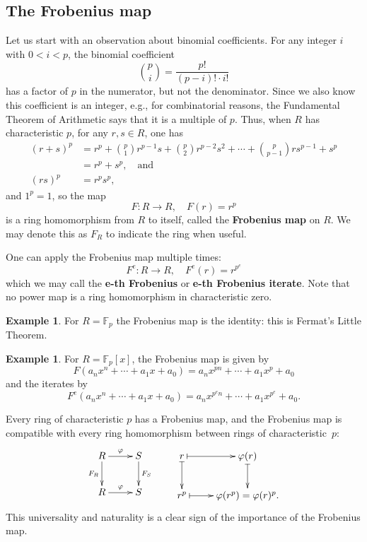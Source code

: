 \documentclass[12pt]{amsart}
\theoremstyle{definition}
\newtheorem{example}[theorem]{Example}
\numberwithin{equation}{theorem}
\def\FF{\mathbb{F}}
\def\phi{\varphi}
\def\to{\longrightarrow}
\begin{document}
\subsection*{The Frobenius map}
Let us start with an observation about binomial coefficients. For any integer $i$ with $0<i<p$, the binomial coefficient 
\[\binom{p}{i} = \frac{p!}{(p-i)! \cdot i!}\]
has a factor of $p$ in the numerator, but not the denominator. Since we also know this coefficient is an integer, e.g., for combinatorial reasons, the Fundamental Theorem of Arithmetic says that it is a multiple of $p$.
Thus, when $R$ has characteristic $p$, for any $r,s\in R$, one has
\[ \begin{aligned} (r+s)^p &= r^p + \binom{p}{1} r^{p-1} s + \binom{p}{2} r^{p-2} s^2 + \cdots + \binom{p}{p-1} r s^{p-1} + s^p \\&= r^p + s^p, \quad \text{and} \\  (rs)^p &= r^p s^p, \end{aligned}\]
and $1^p=1$, so the map
\[ F \colon R \to R, \quad F(r) = r^p\]
is a ring homomorphism from $R$ to itself, called the \textbf{Frobenius map} on $R$. We may denote this as $F_R$ to indicate the ring when useful.

One can apply the Frobenius map multiple times:
\[ F^e \colon R \to R, \quad F^e(r) = r^{p^e}\]
which we may call the \textbf{e-th Frobenius} or \textbf{e-th Frobenius iterate}.
Note that no power map is a ring homomorphism in characteristic zero.

\begin{example} 
For $R=\FF_p$ the Frobenius map is the identity: this is Fermat's Little Theorem.
\end{example}

\begin{example} 
For $R=\FF_p[x]$, the Frobenius map is given by
\[ F( a_n x^n + \cdots + a_1 x + a_0) = a_n x^{pn} + \cdots + a_1 x^p + a_0\]
and the iterates by
\[ F^e( a_n x^n + \cdots + a_1 x + a_0) = a_n x^{p^en} + \cdots + a_1 x^{p^e} + a_0.\]
\end{example}

 Every ring of characteristic $p$ has a Frobenius map, and the Frobenius map is compatible with every ring homomorphism between rings of characteristic~$p$:
\[ \xymatrix{ R \ar[r]^-{\phi} \ar[d]_-{F_R}  & S \ar[d]^-{F_S} \\ R \ar[r]^-{\phi} & S} \qquad  \xymatrix{ r \ar@{|->}[r]  \ar@{|->}[d] & \phi(r)  \ar@{|->}[d] \\ r^p  \ar@{|->}[r] & \phi(r^p) = \phi(r)^p.} \]
This universality and naturality is a clear sign of the importance of the Frobenius map.
\end{document}
